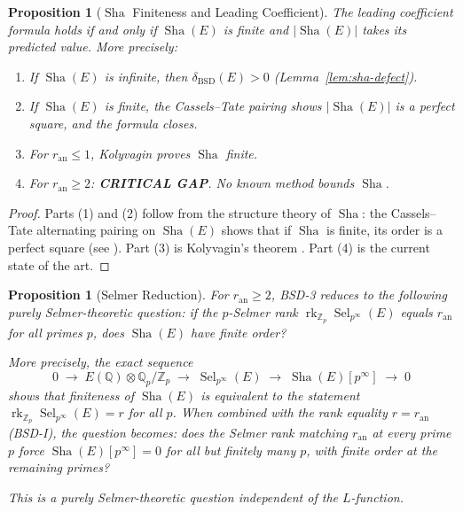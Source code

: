 \documentclass[11pt]{article}
\newtheorem{proposition}[theorem]{Proposition}
\DeclareMathOperator{\rk}{rk}
\DeclareMathOperator{\Sha}{Sha}
\DeclareMathOperator{\Sel}{Sel}
\begin{document}
\begin{proposition}[$\Sha$ Finiteness and Leading Coefficient]
\label{prop:bsd3}
The leading coefficient formula holds if and only if $\Sha(E)$ is finite and
$|\Sha(E)|$ takes its predicted value.  More precisely:
\begin{enumerate}
  \item If $\Sha(E)$ is infinite, then $\delta_{\mathrm{BSD}}(E) > 0$
    (Lemma~\ref{lem:sha-defect}).
  \item If $\Sha(E)$ is finite, the Cassels--Tate pairing shows
    $|\Sha(E)|$ is a perfect square, and the formula closes.
  \item For $r_{\mathrm{an}} \leq 1$, Kolyvagin \cite{Koly} proves $\Sha$
    finite.
  \item For $r_{\mathrm{an}} \geq 2$: \textbf{CRITICAL GAP}.  No known method
    bounds $\Sha$.
\end{enumerate}
\end{proposition}

\begin{proof}
Parts (1) and (2) follow from the structure theory of $\Sha$: the Cassels--Tate
alternating pairing on $\Sha(E)$ shows that if $\Sha$ is finite, its order is
a perfect square (see \cite{Cassels}).  Part (3) is Kolyvagin's theorem
\cite{Koly}.  Part (4) is the current state of the art.
\end{proof}

\begin{proposition}[Selmer Reduction]
\label{prop:selmer-reduction}
For $r_{\mathrm{an}} \geq 2$, BSD-3 reduces to the following purely
Selmer-theoretic question: if the $p$-Selmer rank
$\rk_{\mathbb{Z}_p} \Sel_{p^\infty}(E)$ equals $r_{\mathrm{an}}$ for all
primes $p$, does $\Sha(E)$ have finite order?

More precisely, the exact sequence
\[
  0 \;\to\; E(\mathbb{Q}) \otimes \mathbb{Q}_p / \mathbb{Z}_p
  \;\to\; \Sel_{p^\infty}(E)
  \;\to\; \Sha(E)[p^\infty]
  \;\to\; 0
\]
shows that finiteness of $\Sha(E)$ is equivalent to the statement
$\rk_{\mathbb{Z}_p} \Sel_{p^\infty}(E) = r$ for all $p$.  When combined
with the rank equality $r = r_{\mathrm{an}}$ (BSD-I), the question becomes:
does the Selmer rank matching $r_{\mathrm{an}}$ at every prime $p$ force
$\Sha(E)[p^\infty] = 0$ for all but finitely many $p$, with finite order at
the remaining primes?

This is a purely Selmer-theoretic question independent of the $L$-function.
\end{proposition}
\end{document}
